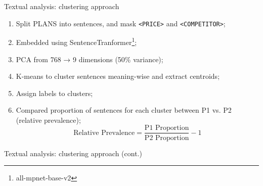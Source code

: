\documentclass[10pt, aspectratio=169]{beamer}
\begin{document}
\begin{frame}[fragile]{Textual analysis: clustering approach}\label{slide:cluster_approach}
    \begin{enumerate}
        \item Split PLANS into sentences, and mask \texttt{<PRICE>} and \texttt{<COMPETITOR>};
        \item Embedded using SentenceTranformer\footnote{all-mpnet-base-v2};
        \item PCA from 768 → 9 dimensions (50\% variance);
        \item K-means to cluster sentences meaning-wise and extract centroids;
        \item Assign labels to clusters; \hyperlink{app:cluster_examples}{}
        \item Compared proportion of sentences for each cluster between P1 vs. P2 (relative prevalence);
        $$
        \text{Relative Prevalence} = \frac{\text{P1 Proportion}}{\text{P2 Proportion}} - 1
        $$
    \end{enumerate}
\end{frame}


\begin{frame}[fragile]{Textual analysis: clustering approach (cont.)}



\end{frame}
\end{document}
